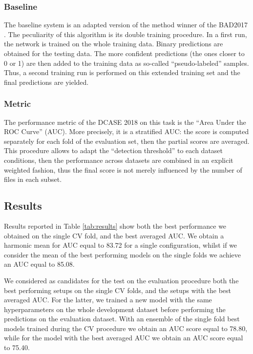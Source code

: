 \subsubsection{Baseline}
The baseline system is an adapted version of the method winner of the BAD2017 \cite{grill2017two}. The peculiarity of this algorithm is its double training procedure. In a first run, the network is trained on the whole training data. Binary predictions are obtained for the testing data. The more confident predictions (the ones closer to 0 or 1) are then added to the training data as so-called ``pseudo-labeled'' samples. Thus, a second training run is performed on this extended training set and the final predictions are yielded.


\subsubsection{Metric}
The performance metric of the DCASE 2018 on this task is the ``Area Under the ROC Curve'' (AUC). More precisely, it is a stratified AUC: the score is computed separately for each fold of the evaluation set, then the partial scores are averaged. This procedure allows to adapt the ``detection threshold'' to each dataset conditions, then the performance across datasets are combined in an explicit weighted fashion, thus the final score is not merely influenced by the number of files in each subset.


\subsection{Results}
Results reported in Table \ref{tab:results} show both the best performance we obtained on the single CV fold, and the best averaged AUC. We obtain a harmonic mean for AUC equal to 83.72 for a single configuration, whilst if we consider the mean of the best performing models on the single folds we achieve an AUC equal to 85.08.

We considered as candidates for the test on the evaluation procedure \cite{dcase2018web} both the best performing setups on the single CV folds, and the setups with the best averaged AUC. For the latter, we trained a new model with the same hyperparameters on the whole development dataset before performing the predictions on the evaluation dataset. With an ensemble of the single fold best models trained during the CV procedure we obtain an AUC score equal to 78.80, while for the model with the best averaged AUC we obtain an AUC score equal to 75.40.
 
